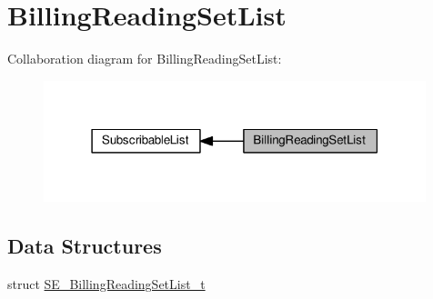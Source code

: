 \hypertarget{group__BillingReadingSetList}{}\section{Billing\+Reading\+Set\+List}
\label{group__BillingReadingSetList}
Collaboration diagram for Billing\+Reading\+Set\+List\+:\nopagebreak
\begin{figure}[H]
\begin{center}
\leavevmode
\includegraphics[width=315pt]{group__BillingReadingSetList}
\end{center}
\end{figure}
\subsection*{Data Structures}
\begin{DoxyCompactItemize}
\item 
struct \hyperlink{structSE__BillingReadingSetList__t}{S\+E\+\_\+\+Billing\+Reading\+Set\+List\+\_\+t}
\end{DoxyCompactItemize}
